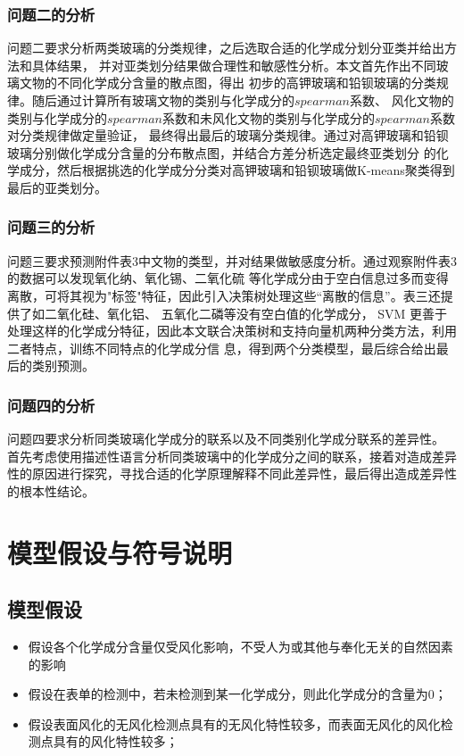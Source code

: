 \documentclass[withoutpreface,bwprint]{cumcmthesis} %
\begin{document}
\subsubsection{问题二的分析}

问题二要求分析两类玻璃的分类规律，之后选取合适的化学成分划分亚类并给出方法和具体结果， 并对亚类划分结果做合理性和敏感性分析。本文首先作出不同玻璃文物的不同化学成分含量的散点图，得出 初步的高钾玻璃和铅钡玻璃的分类规律。随后通过计算所有玻璃文物的类别与化学成分的$spearman$系数、 风化文物的类别与化学成分的$spearman$系数和未风化文物的类别与化学成分的$spearman$系数对分类规律做定量验证， 最终得出最后的玻璃分类规律。通过对高钾玻璃和铅钡玻璃分别做化学成分含量的分布散点图，并结合方差分析选定最终亚类划分 的化学成分，然后根据挑选的化学成分分类对高钾玻璃和铅钡玻璃做K-means聚类得到最后的亚类划分。

\subsubsection{问题三的分析}

问题三要求预测附件表3中文物的类型，并对结果做敏感度分析。通过观察附件表3的数据可以发现氧化纳、氧化锡、二氧化硫 等化学成分由于空白信息过多而变得离散，可将其视为"标签"特征，因此引入决策树处理这些“离散的信息”。表三还提供了如二氧化硅、氧化铝、 五氧化二磷等没有空白值的化学成分， SVM 更善于处理这样的化学成分特征，因此本文联合决策树和支持向量机两种分类方法，利用二者特点，训练不同特点的化学成分信 息，得到两个分类模型，最后综合给出最后的类别预测。

\subsubsection{问题四的分析}

问题四要求分析同类玻璃化学成分的联系以及不同类别化学成分联系的差异性。 首先考虑使用描述性语言分析同类玻璃中的化学成分之间的联系，接着对造成差异性的原因进行探究，寻找合适的化学原理解释不同此差异性，最后得出造成差异性的根本性结论。

 
\section{模型假设与符号说明}
\subsection{模型假设}

\begin{itemize}
	\item 假设各个化学成分含量仅受风化影响，不受人为或其他与奉化无关的自然因素的影响
	\item 假设在表单的检测中，若未检测到某一化学成分，则此化学成分的含量为0；
	\item 假设表面风化的无风化检测点具有的无风化特性较多，而表面无风化的风化检测点具有的风化特性较多；
\end{itemize}
\end{document}
